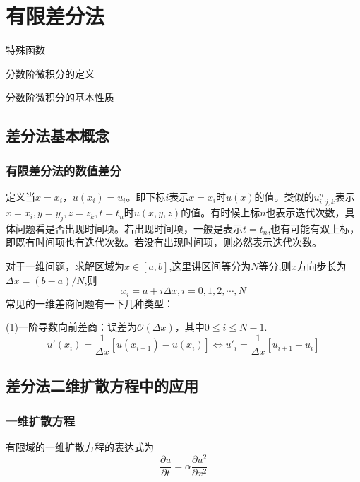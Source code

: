 \chapter{有限差分法}
  
\begin{introduction}   
\item 特殊函数
\item 分数阶微积分的定义
\item 分数阶微积分的基本性质
\end{introduction}

\section{差分法基本概念}
\subsection{有限差分法的数值差分}

定义当$x=x_i$，$u(x_i) = u_i$。即下标$i$表示$x=x_i$时$u(x)$的值。类似的$u_{i,j,k}^{n}$表示$x=x_i,y=y_j,z=z_k,t=t_n$时$u(x,y,z)$的值。有时候上标$n$也表示迭代次数，具体问题看是否出现时间项。若出现时间项，一般是表示$t=t_n$,也有可能有双上标，即既有时间项也有迭代次数。若没有出现时间项，则必然表示迭代次数。

对于一维问题，求解区域为$x \in [a,b] $,这里讲区间等分为$N$等分,则$x$方向步长为$\Delta x = (b-a)/N$,则
$$x_i = a+i\Delta x,i=0,1,2,\cdots, N$$
常见的一维差商问题有一下几种类型：

(1)一阶导数向前差商：误差为$ \mathcal{O}(\Delta x)$，其中$0 \le i \le N-1$.
\begin{equation}
	u'(x_i) = \frac{1}{\Delta x}\left[u(x_{i+1})-u(x_i)\right] \Leftrightarrow u'_i  = \frac{1}{\Delta x}\left[u_{i+1}-u_i\right]
\end{equation} 


\section{差分法二维扩散方程中的应用}

\subsection{一维扩散方程}

有限域的一维扩散方程的表达式为
$$ \frac{\partial u}{\partial t} = \alpha \frac{\partial u^2}{\partial x^2}$$

